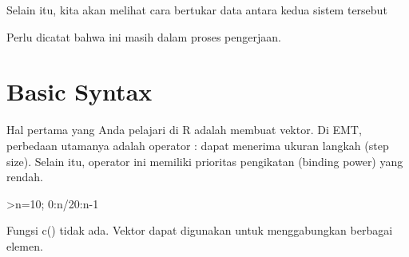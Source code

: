 \documentclass{article}
\newenvironment{eulernotebook}{\par}{\par}
\newcommand{\eulerheading}[1]{\section{#1}}
\newenvironment{eulercomment}{\par\medskip}{\par\medskip}
\begin{document}
\begin{eulernotebook}
\begin{eulercomment}
\begin{eulercomment}
\begin{eulercomment}
\begin{eulercomment}
\begin{eulercomment}
Selain itu, kita akan melihat cara bertukar data antara kedua sistem
tersebut
\end{eulercomment}
\begin{eulercomment}
Perlu dicatat bahwa ini masih dalam proses pengerjaan.
\end{eulercomment}
\eulerheading{Basic Syntax}
\begin{eulercomment}
Hal pertama yang Anda pelajari di R adalah membuat vektor. Di EMT,
perbedaan utamanya adalah operator : dapat menerima ukuran langkah
(step size). Selain itu, operator ini memiliki prioritas pengikatan
(binding power) yang rendah.
\end{eulercomment}
\begin{eulerprompt}
>n=10; 0:n/20:n-1
\end{eulerprompt}
\begin{euleroutput}
  [0,  0.5,  1,  1.5,  2,  2.5,  3,  3.5,  4,  4.5,  5,  5.5,  6,  6.5,
  7,  7.5,  8,  8.5,  9]
\end{euleroutput}
\begin{eulercomment}
Fungsi c() tidak ada. Vektor dapat digunakan untuk menggabungkan
berbagai elemen.


\end{eulercomment}
\end{eulercomment}
\end{eulercomment}
\end{eulercomment}
\end{eulercomment}
\end{eulernotebook}
\end{document}
